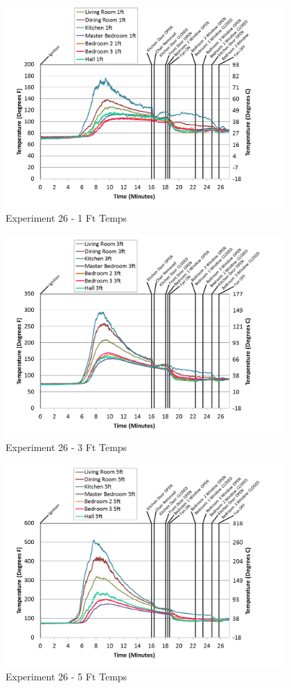 \documentclass{article}
\begin{document}
\begin{appendices}
\begin{figure}[h!]
	\centering
	\includegraphics[height=3.05in]{0_Images/Results_Charts/Exp_26_Charts/1FtTemps.png}
	\caption{Experiment 26 - 1 Ft Temps}
\end{figure}


\begin{figure}[h!]
	\centering
	\includegraphics[height=3.05in]{0_Images/Results_Charts/Exp_26_Charts/3FtTemps.png}
	\caption{Experiment 26 - 3 Ft Temps}
\end{figure}

\clearpage

\begin{figure}[h!]
	\centering
	\includegraphics[height=3.05in]{0_Images/Results_Charts/Exp_26_Charts/5FtTemps.png}
	\caption{Experiment 26 - 5 Ft Temps}
\end{figure}



\end{appendices}
\end{document}
